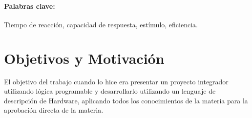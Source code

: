 \documentclass[11pt,a4paper,twocolumn]{article}
\begin{document}
\paragraph{Palabras clave:}
Tiempo de reacción, capacidad de respuesta, estímulo, eficiencia.

\section*{Objetivos y Motivación}
El objetivo del trabajo cuando lo hice era presentar un proyecto integrador utilizando lógica programable y desarrollarlo utilizando un lenguaje de descripción de Hardware, aplicando todos los conocimientos de la materia para la aprobación directa de la materia.



\begin{flushright}

\end{flushright}
\end{document}
